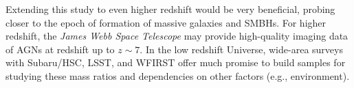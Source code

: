 \documentclass[twocolumn,trackchanges]{aastex63}
\newcommand{\mbh}{$\mathcal M_{\rm BH}$}
\newcommand{\lhost}{$L_{\rm host}$}
\newcommand{\mstar}{{$M_*$}}
\begin{document}
Extending this study to even higher redshift would be very beneficial, probing closer to the epoch of formation of massive galaxies and SMBHs. For higher redshift, the {\it James Webb Space Telescope} may provide high-quality imaging data of AGNs at redshift up to $z\sim7$. In the low redshift Universe, wide-area surveys with Subaru/HSC, LSST, and WFIRST offer much promise to build samples for studying these mass ratios and dependencies on other factors (e.g., environment).



\end{document}
